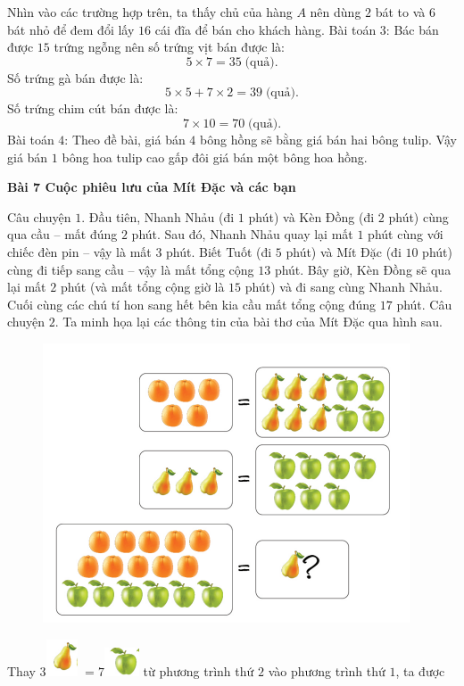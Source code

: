 Nhìn vào các trường hợp trên, ta thấy chủ của hàng $A$ nên dùng $2$ bát to và $6$ bát nhỏ để đem đổi lấy $16$ cái đĩa để bán cho khách hàng.
\vskip 0.1cm
Bài toán $3$:
\vskip 0.1cm
Bác bán được $15$ trứng ngỗng nên số trứng vịt bán được là: 
$$5\times 7=35 \;\text{(quả)}.$$
Số trứng gà bán được là:
$$5\times 5+ 7\times 2= 39 \;\text{(quả)}.$$
Số trứng chim cút bán được là:
$$7\times 10=70 \;\text{(quả)}.$$
\vskip 0.1cm
Bài toán $4$:
\vskip 0.1cm
Theo đề bài, giá bán $4$ bông hồng sẽ bằng giá bán hai bông tulip. Vậy giá bán $1$ bông hoa tulip cao gấp đôi giá bán một bông hoa hồng.
\begin{center}
	\textbf{\color{toancuabi}Bài $\pmb7$ Cuộc phiêu lưu của Mít Đặc và các bạn}
\end{center}
Câu chuyện $1.$
\vskip 0.1cm
Đầu tiên, Nhanh Nhảu (đi $1$ phút) và Kèn Đồng (đi $2$ phút) cùng qua cầu -- mất đúng $2$ phút. Sau đó, Nhanh Nhảu quay lại mất $1$ phút cùng với chiếc đèn pin -- vậy là mất $3$ phút. Biết Tuốt (đi $5$ phút) và Mít Đặc (đi $10$ phút) cùng đi tiếp sang cầu -- vậy là mất tổng cộng $13$ phút. Bây giờ, Kèn Đồng sẽ qua lại mất $2$ phút (và mất tổng cộng giờ là $15$ phút) và đi sang cùng Nhanh Nhảu. Cuối cùng các chú tí hon sang hết bên kia cầu mất tổng cộng đúng $17$ phút.
\vskip 0.1cm
Câu chuyện $2.$ 
\vskip 0.1cm
Ta minh họa lại các thông tin của bài thơ của Mít Đặc qua hình sau.
\begin{figure}[H]
	\centering
	\vspace*{-5pt}
	\captionsetup{labelformat= empty, justification=centering}
	\includegraphics[width=0.5\linewidth]{3}
	\vspace*{-15pt}
\end{figure}
Thay $3$\includegraphics{4}  $= 7$\includegraphics{5} từ phương trình thứ $2$ vào phương trình thứ $1$, ta được
